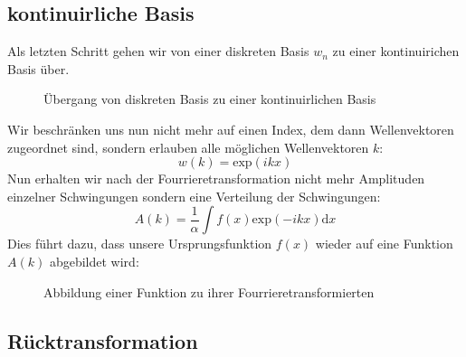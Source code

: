\subsection{kontinuirliche Basis}
Als letzten Schritt gehen wir von einer diskreten Basis $w_n$ zu einer kontinuirichen Basis über.
\begin{figure}[H]
	\caption{Übergang von diskreten Basis zu einer kontinuirlichen Basis}
\end{figure}
Wir beschränken uns nun nicht mehr auf einen Index, dem dann Wellenvektoren zugeordnet sind, sondern erlauben alle möglichen Wellenvektoren $k$:
\begin{equation}
	w(k) = \mathrm{exp}(ikx)
\end{equation}
Nun erhalten wir nach der Fourrieretransformation nicht mehr Amplituden einzelner Schwingungen sondern eine Verteilung der Schwingungen:
\begin{equation}
	A(k) = \frac{1}{\alpha} \int f(x) \mathrm{exp}(-ikx) \mathrm{d}x
\end{equation}
Dies führt dazu, dass unsere Ursprungsfunktion $f(x)$ wieder auf eine Funktion $A(k)$ abgebildet wird:
\begin{figure}[H]
	\caption{Abbildung einer Funktion zu ihrer Fourrieretransformierten}
\end{figure}
\subsection{Rücktransformation}
